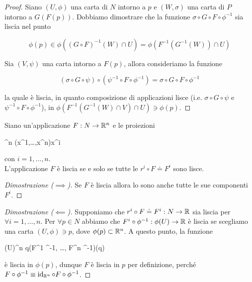 \begin{proof}
	Siano $ (U,\phi) $ una carta di $ N $ intorno a $ p $ e $ (W,\sigma) $ una carta di $ P $ intorno a $ G(F(p)) $. Dobbiamo dimostrare che la funzione $ \sigma \circ G \circ F \circ \phi^{-1} $ sia liscia nel punto
	
	\begin{equation}
		\phi(p) \in \phi((G \circ F)^{-1}(W) \cap U) = \phi(F^{-1}(G^{-1}(W)) \cap U)
	\end{equation}
	
	Sia $ (V,\psi) $ una carta intorno a $ F(p) $, allora consideriamo la funzione
	
	\begin{equation}
		(\sigma \circ G \circ \psi) \circ (\psi^{-1} \circ F \circ \phi^{-1}) = \sigma \circ G \circ F \circ \phi^{-1}
	\end{equation}

	la quale è liscia, in quanto composizione di applicazioni lisce (i.e. $ \sigma \circ G \circ \psi $ e $ \psi^{-1} \circ F \circ \phi^{-1} $), in $ \phi(F^{-1}(G^{-1}(W) \cap V) \cap U) \ni \phi(p) $.
\end{proof}

\begin{definition}[Componenti]\label{map-comp}
	Siano un'applicazione $ F : N \to \mathbb{R}^{n} $ e le proiezioni
	
		{\R^{n}}{\R}
		{(x^{1},\dots,x^{n})}{x^{i}}

	con $ i=1,\dots,n $.\\
	L'applicazione $ F $ è liscia se e solo se tutte le $ r^{i} \circ F \doteq F^{i} $ sono lisce.
\end{definition}

\begin{proof}[Dimostrazione ($ \implies $)]
	Se $ F $ è liscia allora lo sono anche tutte le sue componenti $ F^{i} $.
\end{proof}

\begin{proof}[Dimostrazione ($ \impliedby $)]
	Supponiamo che $ r^{i} \circ F \doteq F^{i} : N \to \mathbb{R} $ sia liscia per $ \forall i=1,\dots,n $. Per $ \forall p \in N $ abbiamo che $ F^{i} \circ \phi^{-1} : \phi(U) \to \mathbb{R} $ è liscia se scegliamo una carta $ (U,\phi) \ni p $, dove $ \phi(p) \subset \mathbb{R}^{n} $. A questo punto, la funzione
	
		{\phi(U)}{\R^{n}}
		{q}{(F^{1} \circ \phi^{-1}, \dots, F^{n} \circ \phi^{-1})(q)}

	è liscia in $ \phi(p) $, dunque $ F $ è liscia in $ p $ per definizione, perché $ F \circ \phi^{-1} \equiv \operatorname{id}_{\mathbb{R}^{n}} \circ F \circ \phi^{-1} $.
\end{proof}


